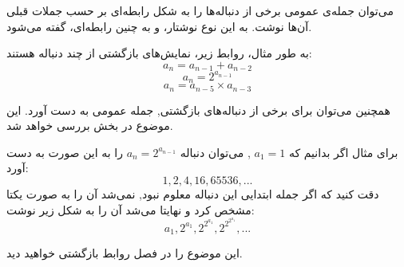 
\begin{DEFINITION}
    \p
    می‌توان جمله‌ی عمومی برخی از دنباله‌ها را به شکل رابطه‌ای بر حسب جملات قبلی آن‌ها نوشت.
    به این نوع نوشتار،
    و به چنین رابطه‌ای،
    گفته می‌شود.
\end{DEFINITION}

\p
به طور مثال، روابط زیر، نمایش‌های بازگشتی از چند دنباله هستند:
$$a_n=a_{n-1}+a_{n-2}$$
$$a_n=2^{a_{n-1}}$$
$$a_n=a_{n-5}\times a_{n-3}$$

\p
همچنین می‌توان برای برخی از دنباله‌های بازگشتی, جمله عمومی به دست آورد. این موضوع در بخش  بررسی خواهد شد.

\p
برای مثال اگر بدانیم که 
$a_1=1$
,
می‌توان دنباله
$a_n=2^{a_{n-1}}$
را به این صورت به دست آورد:
\[1,2,4,16,65536,...\]
دقت کنید که اگر جمله ابتدایی این دنباله معلوم نبود, نمی‌شد آن را به صورت یکتا مشخص کرد و نهایتا می‌شد آن را به شکل زیر نوشت:
\[a_1,2^{a_1},2^{2^{a_1}},2^{2^{2^{a_1}}},...\]




 این موضوع را در فصل روابط بازگشتی خواهید دید.







